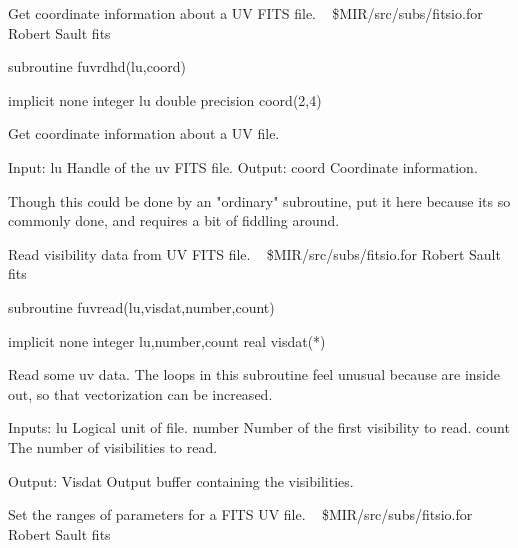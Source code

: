 %
\noindent Get coordinate information about a UV FITS file.
\newline \ 
\newline {} \$MIR/src/subs/fitsio.for
\newline {} Robert Sault
\newline {} fits
\par{\tenpoint
{\eightpoint\begintt
        subroutine fuvrdhd(lu,coord)

        implicit none
        integer lu
        double precision coord(2,4)

  Get coordinate information about a UV file.

  Input:
    lu         Handle of the uv FITS file.
  Output:
    coord      Coordinate information.

  Though this could be done by an "ordinary" subroutine, put it here because
  its so commonly done, and requires a bit of fiddling around.
\endtt}
\par}
%
\noindent Read visibility data from UV FITS file.
\newline \ 
\newline {} \$MIR/src/subs/fitsio.for
\newline {} Robert Sault
\newline \abox{Keywords:} fits
\par{\tenpoint
{\eightpoint\begintt
        subroutine fuvread(lu,visdat,number,count)

        implicit none
        integer lu,number,count
        real visdat(*)

  Read some uv data.
  The loops in this subroutine feel unusual because are inside out,
  so that vectorization can be increased.

  Inputs:
    lu         Logical unit of file.
    number     Number of the first visibility to read.
    count      The number of visibilities to read.

  Output:
    Visdat     Output buffer containing the visibilities.
\endtt}
\par}
%
\noindent Set the ranges of parameters for a FITS UV file.
\newline \ 
\newline {} \$MIR/src/subs/fitsio.for
\newline \abox{Responsible:} Robert Sault
\newline {} fits
